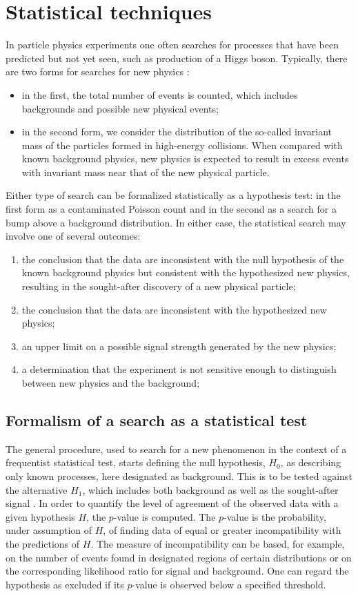 \documentclass[a4paper, oneside, 11pt, openright]{book}
\begin{document}
	\chapter{Statistical techniques}
		In particle physics experiments one often searches for processes that have been predicted but not yet seen, such as production of a Higgs boson. 
		Typically, there are two forms for searches for new physics \cite{Higgs_statistic}:
		\begin{itemize}
			\item in the first, the total number of events is counted, which includes backgrounds and possible new physical events;
			\item in the second form, we consider the distribution of the so-called invariant mass of the particles formed in high-energy collisions. When compared with known background physics, new physics is expected to result in excess events with invariant mass near that of the new physical particle.
		\end{itemize}
		Either type of search can be formalized statistically as a hypothesis test: in the first form as a contaminated Poisson count and in the second as a search for a bump above a background distribution. In either case, the statistical search may involve one of several outcomes:
		\begin{enumerate}
			\item the conclusion that the data are inconsistent with the null hypothesis of the known background physics but consistent with the hypothesized new physics, resulting in the sought-after discovery of a new physical particle;
			\item the conclusion that the data are inconsistent with the hypothesized new physics;
			\item an upper limit on a possible signal strength generated by the new physics;
			\item a determination that the experiment is not sensitive enough to distinguish between new physics and the background;
		\end{enumerate}
	
		\section{Formalism of a search as a statistical test}
 			The general procedure, used to search for a new phenomenon in the context of a frequentist statistical test, starts defining the null hypothesis, $H_0$, as describing only known processes, here designated as background. This is to be tested against the alternative $H_1$, which includes both background as well as the sought-after signal \cite{Statistic}. In order to quantify the level of agreement of the observed data with a given hypothesis $H$, the $p$-value is computed. The $p$-value is the probability, under assumption of $H$, of finding data of equal or greater incompatibility with the predictions of $H$. The measure of incompatibility can be based, for example, on the number of events found in designated regions of certain distributions or on the corresponding likelihood ratio for signal and background. One can regard the hypothesis as excluded if its $p$-value is observed below a specified threshold.
 			
\end{document}
